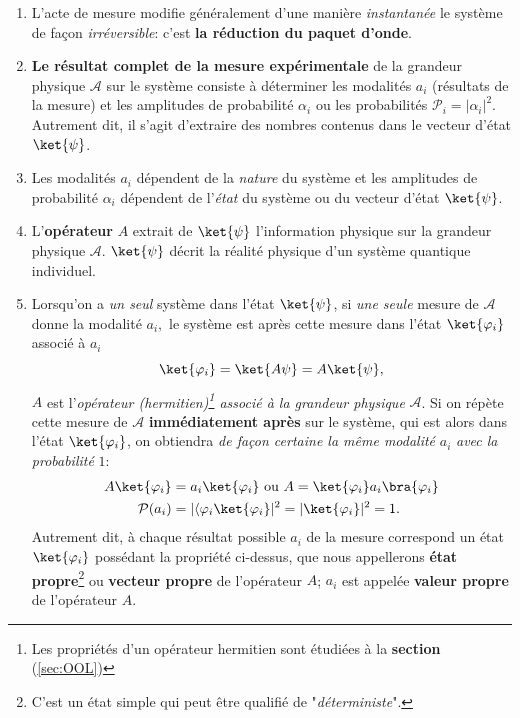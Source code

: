 \begin{enumerate}
\item L'acte de mesure modifie généralement d'une manière \emph{instantanée}
le système de façon \emph{irréversible}: c'est \textbf{la réduction du paquet
d'onde}.

\item \textbf{Le résultat complet de la mesure expérimentale} de la grandeur
physique $\mathcal{A}$ sur le système consiste à déterminer les modalités
$a_{i}$ (résultats de la mesure) et les amplitudes de probabilité $\alpha_{i}$
ou les probabilités $\mathcal{P}_{i}=|\alpha_{i}|^{2}$. Autrement dit, il s'agit
d'extraire des nombres contenus dans le vecteur d'état $\ket{\psi}$.

\item Les modalités $a_{i}$ dépendent de la \emph{nature} du système et les
amplitudes de probabilité $\alpha_{i}$ dépendent de l'\emph{état} du système
ou du vecteur d'état $\ket{\psi}$.

\item L'\textbf{opérateur} $A$ extrait de $\ket{\psi}$ l'information physique
sur la grandeur physique $\mathcal{A}$. $\ket{\psi}$ décrit la réalité physique
d'un système quantique individuel.

\item Lorsqu'on a \emph{un seul} système dans l'état $\ket{\psi}$, si \emph{une
seule} mesure de $\mathcal{A}$ donne la modalité $a_{i},$ le système est après
cette mesure dans l'état $\ket{\varphi_{i}}$ associé à $a_{i}$%
\begin{equation}
\ket{\varphi_{i}}=\ket{A\psi}=A\ket{\psi} ,
\end{equation}
$A$ est l'\emph{opérateur (hermitien)\footnote{Les propriétés d'un opérateur
hermitien sont étudiées à la \textbf{section} (\ref{sec:OOL})} associé à la
grandeur physique} $\mathcal{A}$. Si on répète cette mesure de $\mathcal{A}$
\textbf{immédiatement après }sur le système, qui est alors dans l'état
$\ket{\varphi_{i}}$, on obtiendra \emph{de façon certaine la même modalité}
$a_{i}$ \emph{avec la probabilité} $1$:%
\begin{subequations}%
\begin{align}
A\ket{\varphi_{i}} &  =a_{i}\ket{\varphi_{i}}\text{ ou }
A=\ket{\varphi_{i}}a_{i}\bra{\varphi_{i}} \\
\mathcal{P}(a_{i}) & =|\langle\varphi_{i}\ket{\varphi_{i}}|^{2}
=|\ket{\varphi_{i}}|^{2}=1.
\end{align}%
\end{subequations}%
Autrement dit, à chaque résultat possible $a_{i}$ de la mesure correspond un
état $\ket{\varphi_{i}}$ possédant la propriété ci-dessus, que nous appellerons
\textbf{état propre}\footnote{C'est un état simple qui peut être qualifié de
"\emph{déterministe}".} ou \textbf{vecteur propre} de l'opérateur $A$; $a_{i}$
est appelée \textbf{valeur propre} de l'opérateur $A$.


\end{enumerate}
